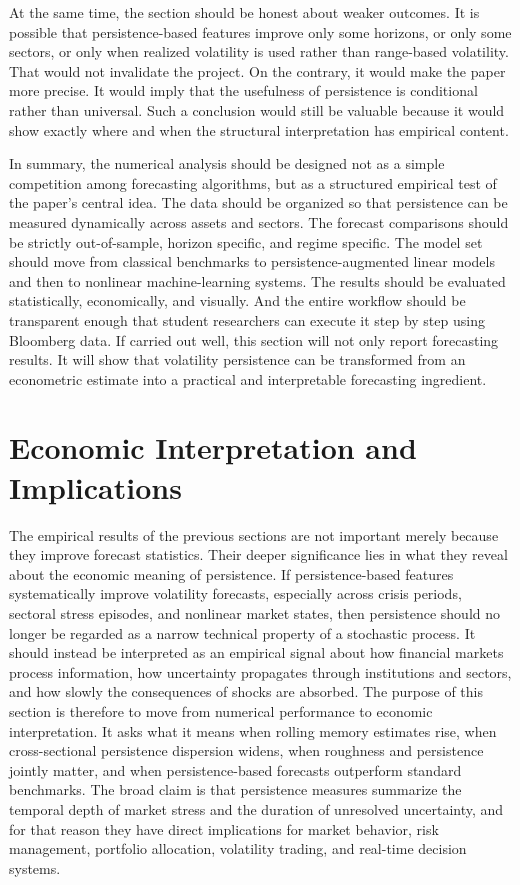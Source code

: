 \documentclass[12pt]{article}
\begin{document}
At the same time, the section should be honest about weaker outcomes. It is possible that persistence-based features improve only some horizons, or only some sectors, or only when realized volatility is used rather than range-based volatility. That would not invalidate the project. On the contrary, it would make the paper more precise. It would imply that the usefulness of persistence is conditional rather than universal. Such a conclusion would still be valuable because it would show exactly where and when the structural interpretation has empirical content.

In summary, the numerical analysis should be designed not as a simple competition among forecasting algorithms, but as a structured empirical test of the paper's central idea. The data should be organized so that persistence can be measured dynamically across assets and sectors. The forecast comparisons should be strictly out-of-sample, horizon specific, and regime specific. The model set should move from classical benchmarks to persistence-augmented linear models and then to nonlinear machine-learning systems. The results should be evaluated statistically, economically, and visually. And the entire workflow should be transparent enough that student researchers can execute it step by step using Bloomberg data. If carried out well, this section will not only report forecasting results. It will show that volatility persistence can be transformed from an econometric estimate into a practical and interpretable forecasting ingredient.



\section{Economic Interpretation and Implications}
\label{sec:econ}

The empirical results of the previous sections are not important merely because they improve forecast statistics. Their deeper significance lies in what they reveal about the economic meaning of persistence. If persistence-based features systematically improve volatility forecasts, especially across crisis periods, sectoral stress episodes, and nonlinear market states, then persistence should no longer be regarded as a narrow technical property of a stochastic process. It should instead be interpreted as an empirical signal about how financial markets process information, how uncertainty propagates through institutions and sectors, and how slowly the consequences of shocks are absorbed. The purpose of this section is therefore to move from numerical performance to economic interpretation. It asks what it means when rolling memory estimates rise, when cross-sectional persistence dispersion widens, when roughness and persistence jointly matter, and when persistence-based forecasts outperform standard benchmarks. The broad claim is that persistence measures summarize the temporal depth of market stress and the duration of unresolved uncertainty, and for that reason they have direct implications for market behavior, risk management, portfolio allocation, volatility trading, and real-time decision systems.
\end{document}

